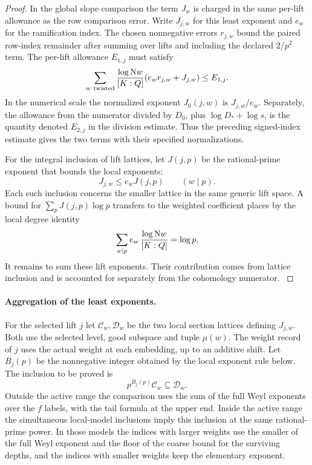 \begin{proof}
In the
global slope comparison the term \(J_w\) is charged in
the same per-lift allowance as the row comparison error.
Write \(J_{j,w}\) for this least exponent and \(e_w\) for
the ramification index. The chosen nonnegative errors
\(r_{j,w}\) bound the paired row-index remainder after
summing over lifts and including the declared \(2/p^2\)
term. The per-lift allowance \(E_{1,j}\)
must satisfy
\[
  \sum_{w\ {\rm twisted}}\frac{\log\mathrm Nw}{[K:Q]}
                  (e_w r_{j,w}+J_{j,w})\le E_{1,j}.
\]
In the numerical scale the normalized exponent
\(J_0(j,w)\) is \(J_{j,w}/e_w\). Separately, the
allowance from the numerator divided by \(D_0\), plus
\(\log D_*+\log s\), is the quantity denoted \(E_{2,j}\)
in the division estimate. Thus the preceding signed-index
estimate gives the two terms with their specified
normalizations.

For the integral inclusion of lift lattices, let \(J(j,p)\) be the rational-prime exponent that bounds the local exponents:
\[
                     J_{j,w}\le e_w J(j,p)\qquad(w\mid p).
\] Each such inclusion concerns the smaller
lattice in the same generic lift space. A bound for
\(\sum_p J(j,p)\log p\) transfers to the weighted coefficient
places by the local degree identity
\[
 \sum_{w\mid p} e_w\,\frac{\log\mathrm Nw}{[K:Q]}=\log p .
\] It remains to sum these lift exponents. Their contribution comes from lattice inclusion and is accounted for separately from the cohomology numerator.
\label{cor:division-length-6}
\label{cor:division-length-7}

\end{proof}

\paragraph{Aggregation of the least exponents.}
For the selected lift \(j\) let \(\mathcal C_w,\mathcal D_w\)
be the two local section lattices defining \(J_{j,w}\).
Both use the selected level, good subspace and tuple
\(\mu(w)\). The weight record of \(j\) uses the actual
weight at each embedding, up to an additive shift.
Let \(B_j(p)\) be the nonnegative integer obtained by the local
exponent rule below. The inclusion to be proved is
\[
                     p^{B_j(p)}\mathcal C_w\subseteq\mathcal D_w .
\]
Outside the active range the comparison uses the sum
of the full Weyl exponents over the \(f\) labels, with
the tail formula at the upper end. Inside the active
range the simultaneous local-model inclusions imply this
inclusion at the same rational-prime power. In those
models the indices with larger weights use the smaller of the full Weyl exponent
and the floor of the coarse bound for the surviving depths, and the indices with smaller weights
keep the elementary exponent.

